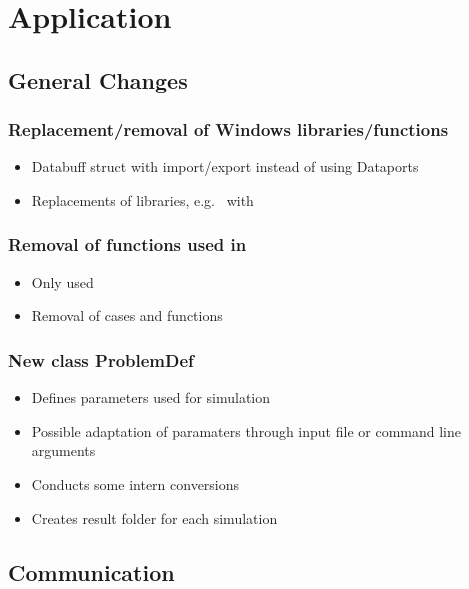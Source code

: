\section{Application}
\subsection{General Changes}

\subsubsection{Replacement/removal of Windows libraries/functions}
\begin{itemize}[noitemsep,topsep=0pt]
\item Databuff struct with import/export instead of using Dataports
\item Replacements of libraries, e.g.\  with 
\end{itemize}

\subsubsection{Removal of functions used in }
\begin{itemize}[noitemsep,topsep=0pt]
\item Only  used
\item Removal of  cases and functions
\end{itemize}

\subsubsection{New class ProblemDef}
\begin{itemize}[noitemsep,topsep=0pt]
\item Defines parameters used for simulation
\item Possible adaptation of paramaters through input file or command line arguments
\item Conducts some intern conversions
\item Creates result folder for each simulation
\end{itemize}

\subsection{Communication}
